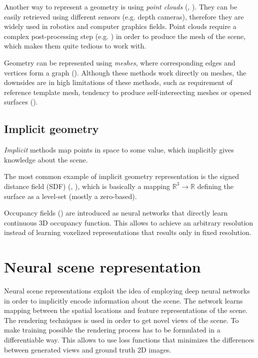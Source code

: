 Another way to represent a geometry is using \textit{point clouds} (\cite{qi2017pointnet}, \cite{fan2016point}).
They can be easily retrieved using different sensors (e.g. depth cameras),
therefore they are widely used in robotics and computer graphics fields.
Point clouds require a complex post-processing step
(e.g. \cite{ballpivoting1999bernardini}) in order to produce the mesh of the scene,
which makes them quite tedious to work with.

Geometry can be represented using \textit{meshes},
where corresponding edges and vertices form a graph (\cite{wang20183d}).
Although these methods work directly on meshes,
the downsides are in high limitations of these methods,
such as requirement of reference template mesh,
tendency to produce self-intersecting meshes or opened surfaces (\cite{groueix2018atlasnet}).

\subsection{Implicit geometry}

\textit{Implicit} methods map points in space to some value,
which implicitly gives knowledge about the scene.

The most common example of implicit geometry representation is the signed distance field (SDF) (\cite{truncdistfield1996curless}, \cite{Lombardi_2019}),
which is basically a mapping $\mathbb{R}^3 \xrightarrow{} \mathbb{R}$ defining the surface as a level-set (mostly a zero-based).

Occupancy fields (\cite{occupancy2019mescheder}) are introduced as neural networks
that directly learn continuous 3D occupancy function.
This allows to achieve an arbitrary resolution
instead of learning voxelized representations
that results only in fixed resolution.






\section{Neural scene representation}

Neural scene representations exploit the idea of employing
deep neural networks in order to implicitly encode information about the scene.
The network learns mapping between the spatial locations and feature representations of the scene.
The rendering techniques is used in order to get novel views of the scene.
To make training possible the rendering process has to be formulated in a differentiable way.
This allows to use loss functions that minimizes the differences between generated views and ground truth 2D images.

